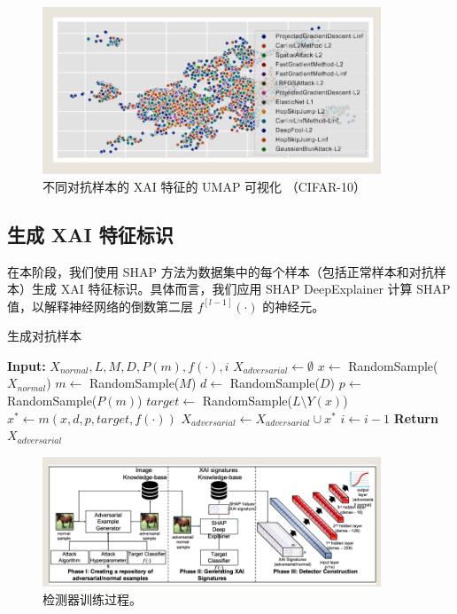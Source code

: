 \documentclass[12pt, a4paper]{ctexart} %
\begin{document}
\begin{figure}[h]
    \centering
    \includegraphics[width=0.9\textwidth]{img/adversaries_4.png}
    \caption{不同对抗样本的 XAI 特征的 UMAP 可视化 （CIFAR-10）}
\end{figure}


\subsection{生成 XAI 特征标识}
在本阶段，我们使用 SHAP 方法为数据集中的每个样本（包括正常样本和对抗样本）生成 XAI 特征标识。具体而言，我们应用 SHAP DeepExplainer 计算 SHAP 值，以解释神经网络的倒数第二层 \( f^{[l-1]}(\cdot) \) 的神经元。
\begin{algorithm}
    \caption{生成对抗样本}
    \begin{algorithmic}[1]  %
    \STATE \textbf{Input:} $X_{normal}, L, M, D, P(m), f(\cdot), i$
    \STATE $X_{adversarial} \gets \emptyset$
        \STATE $x \gets$ RandomSample($X_{normal}$)
        \STATE $m \gets$ RandomSample($M$)
        \STATE $d \gets$ RandomSample($D$)
        \STATE $p \gets$ RandomSample($P(m)$)
        \STATE $target \gets$ RandomSample($L \setminus Y(x)$)
        \STATE $x^* \gets m(x, d, p, target, f(\cdot))$
            \STATE $X_{adversarial} \gets X_{adversarial} \cup x^*$
        \ENDIF
        \STATE $i \gets i - 1$
    \ENDWHILE
    \STATE \textbf{Return} $X_{adversarial}$
    \end{algorithmic}
\end{algorithm}
\begin{figure}
    \centering
    \includegraphics[width=0.9\textwidth]{img/adversaries_5.png}
    \caption{检测器训练过程。}
\end{figure}
\end{document}
